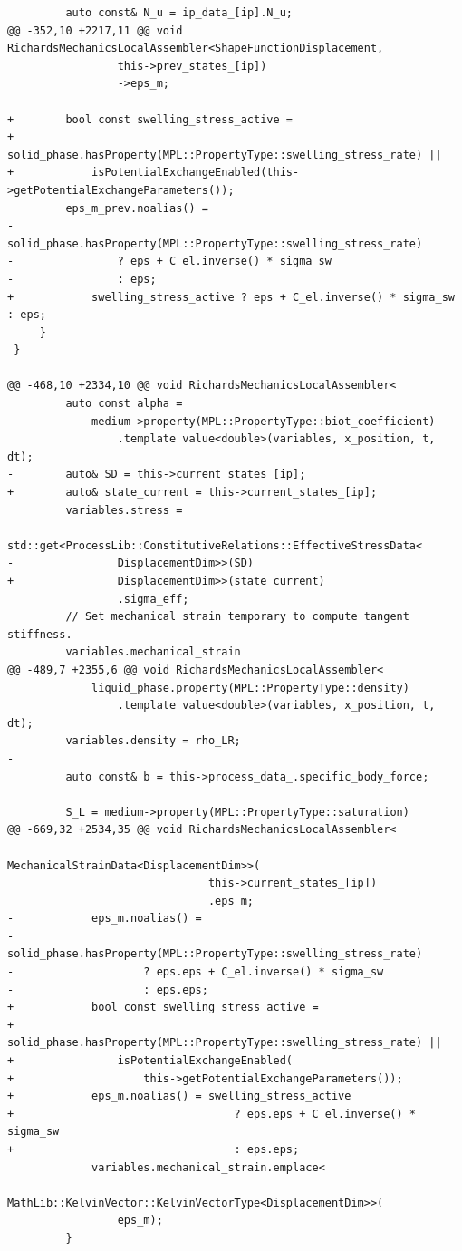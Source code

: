 \documentclass[10pt]{article}
\begin{document}
\begin{lstlisting}
         auto const& N_u = ip_data_[ip].N_u;
@@ -352,10 +2217,11 @@ void RichardsMechanicsLocalAssembler<ShapeFunctionDisplacement,
                 this->prev_states_[ip])
                 ->eps_m;
 
+        bool const swelling_stress_active =
+            solid_phase.hasProperty(MPL::PropertyType::swelling_stress_rate) ||
+            isPotentialExchangeEnabled(this->getPotentialExchangeParameters());
         eps_m_prev.noalias() =
-            solid_phase.hasProperty(MPL::PropertyType::swelling_stress_rate)
-                ? eps + C_el.inverse() * sigma_sw
-                : eps;
+            swelling_stress_active ? eps + C_el.inverse() * sigma_sw : eps;
     }
 }
 
@@ -468,10 +2334,10 @@ void RichardsMechanicsLocalAssembler<
         auto const alpha =
             medium->property(MPL::PropertyType::biot_coefficient)
                 .template value<double>(variables, x_position, t, dt);
-        auto& SD = this->current_states_[ip];
+        auto& state_current = this->current_states_[ip];
         variables.stress =
             std::get<ProcessLib::ConstitutiveRelations::EffectiveStressData<
-                DisplacementDim>>(SD)
+                DisplacementDim>>(state_current)
                 .sigma_eff;
         // Set mechanical strain temporary to compute tangent stiffness.
         variables.mechanical_strain
@@ -489,7 +2355,6 @@ void RichardsMechanicsLocalAssembler<
             liquid_phase.property(MPL::PropertyType::density)
                 .template value<double>(variables, x_position, t, dt);
         variables.density = rho_LR;
-
         auto const& b = this->process_data_.specific_body_force;
 
         S_L = medium->property(MPL::PropertyType::saturation)
@@ -669,32 +2534,35 @@ void RichardsMechanicsLocalAssembler<
                                        MechanicalStrainData<DisplacementDim>>(
                               this->current_states_[ip])
                               .eps_m;
-            eps_m.noalias() =
-                solid_phase.hasProperty(MPL::PropertyType::swelling_stress_rate)
-                    ? eps.eps + C_el.inverse() * sigma_sw
-                    : eps.eps;
+            bool const swelling_stress_active =
+                solid_phase.hasProperty(MPL::PropertyType::swelling_stress_rate) ||
+                isPotentialExchangeEnabled(
+                    this->getPotentialExchangeParameters());
+            eps_m.noalias() = swelling_stress_active
+                                  ? eps.eps + C_el.inverse() * sigma_sw
+                                  : eps.eps;
             variables.mechanical_strain.emplace<
                 MathLib::KelvinVector::KelvinVectorType<DisplacementDim>>(
                 eps_m);
         }
 

\end{lstlisting}
\end{document}
